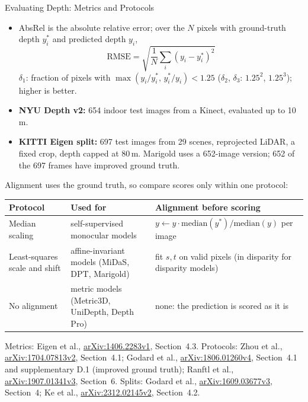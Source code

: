 \begin{frame}{Evaluating Depth: Metrics and Protocols}
  \begin{itemize}\footnotesize\itemsep0.2em
    \item AbsRel is the absolute relative error; over the $N$ pixels with ground-truth depth $y_i^*$ and predicted depth $y_i$,
    \[ \textstyle \text{RMSE}=\sqrt{\frac{1}{N}\sum_i (y_i-y_i^*)^2} \]
    $\delta_1$: fraction of pixels with $\max(y_i/y_i^*,\, y_i^*/y_i) < 1.25$ ($\delta_2$, $\delta_3$: $1.25^2$, $1.25^3$); higher is better.
    \item \textbf{NYU Depth v2:} 654 indoor test images from a Kinect, evaluated up to 10\,m.
    \item \textbf{KITTI Eigen split:} 697 test images from 29 scenes, reprojected LiDAR, a fixed crop, depth capped at 80\,m. Marigold uses a 652-image version; 652 of the 697 frames have improved ground truth.
  \end{itemize}
  {\footnotesize Alignment uses the ground truth, so compare scores only within one protocol:\par}
  \vspace{0.15em}
  {\centering\scriptsize\setlength{\tabcolsep}{4pt}
  \begin{tabular}{>{\raggedright\arraybackslash}p{2.6cm} >{\raggedright\arraybackslash}p{5.6cm} >{\raggedright\arraybackslash}p{4.8cm}}
    \toprule
    \textbf{Protocol} & \textbf{Used for} & \textbf{Alignment before scoring} \\
    \midrule
    Median scaling & self-supervised monocular models & $y \leftarrow y\cdot\text{median}(y^*)/\text{median}(y)$ per image \\
    \addlinespace[0.1em]
    Least-squares scale and shift & affine-invariant models (MiDaS, DPT, Marigold) & fit $s, t$ on valid pixels (in disparity for disparity models) \\
    \addlinespace[0.1em]
    No alignment & metric models (Metric3D, UniDepth, Depth Pro) & none: the prediction is scored as it is \\
    \bottomrule
  \end{tabular}\par}
  \vspace{0.15em}
  {\scriptsize Metrics: Eigen et al., \href{https://arxiv.org/abs/1406.2283v1}{arXiv:1406.2283v1}, Section~4.3. Protocols: Zhou et al., \href{https://arxiv.org/abs/1704.07813v2}{arXiv:1704.07813v2}, Section~4.1; Godard et al., \href{https://arxiv.org/abs/1806.01260v4}{arXiv:1806.01260v4}, Section~4.1 and supplementary D.1 (improved ground truth); Ranftl et al., \href{https://arxiv.org/abs/1907.01341v3}{arXiv:1907.01341v3}, Section~6. Splits: Godard et al., \href{https://arxiv.org/abs/1609.03677v3}{arXiv:1609.03677v3}, Section~4; Ke et al., \href{https://arxiv.org/abs/2312.02145v2}{arXiv:2312.02145v2}, Section~4.2.\par}
\end{frame}
